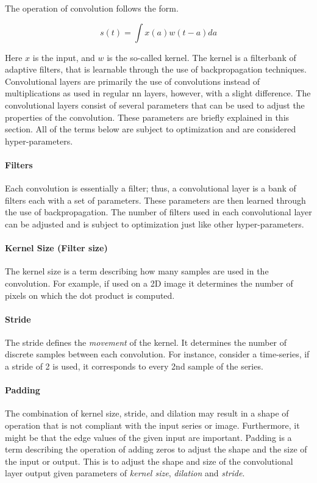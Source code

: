The operation of convolution follows the form.

\begin{equation}\label{eq:convolution}
  s(t) = \int x(a)w(t-a)da
\end{equation}

Here $x$ is the input, and $w$ is the so-called kernel. The kernel is a filterbank of adaptive filters, that is learnable through the use of backpropagation techniques. Convolutional layers are primarily the use of convolutions instead of multiplications as used in regular \gls{nn} layers, however, with a slight difference. The convolutional layers consist of several parameters that can be used to adjust the properties of the convolution. These parameters are briefly explained in this section. All of the terms below are subject to optimization and are considered hyper-parameters.

\paragraph{Filters}
Each convolution is essentially a filter; thus, a convolutional layer is a bank of filters each with a set of parameters. These parameters are then learned through the use of backpropagation. The number of filters used in each convolutional layer can be adjusted and is subject to optimization just like other hyper-parameters. 

\paragraph{Kernel Size (Filter size)}
The kernel size is a term describing how many samples are used in the convolution. For example, if used on a 2D image it determines the number of pixels on which the dot product is computed. 


\paragraph{Stride}
The stride defines the \textit{movement} of the kernel. It determines the number of discrete samples between each convolution. For instance, consider a time-series, if a stride of 2 is used, it corresponds to every 2nd sample of the series. 

\paragraph{Padding}
The combination of kernel size, stride, and dilation may result in a shape of operation that is not compliant with the input series or image. Furthermore, it might be that the edge values of the given input are important. Padding is a term describing the operation of adding zeros to adjust the shape and the size of the input or output. This is to adjust the shape and size of the convolutional layer output given parameters of \emph{kernel size}, \emph{dilation} and \emph{stride}.

